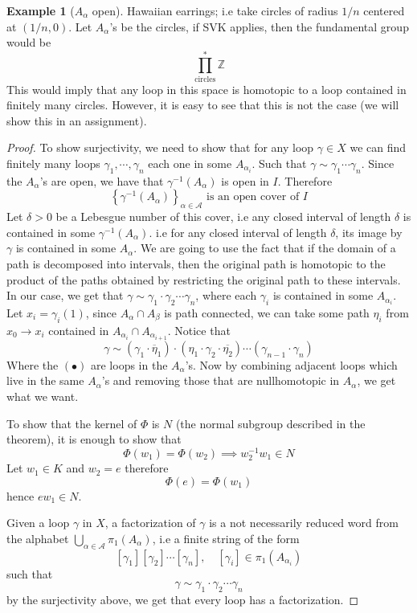 \documentclass[11pt,a4paper]{article}
\theoremstyle{definition}
\newtheorem{example}[definition]{Example}
\theoremstyle{plain}
\theoremstyle{remark}
\newcommand{\Z}{\mathbb{Z}}
\renewcommand{\set}[1]{\left\{ #1 \right\}}
\newcommand{\1}{\mathbbm{1}}
\begin{document}
\begin{example}[$A_\alpha$ open]
    Hawaiian earrings; i.e take circles of radius $1/n$ centered at $(1/n,0)$. Let $A_\alpha$'s be the circles, if SVK applies, then 
    the fundamental group would be 
    $$\prod_{\text{circles}}^* \Z$$
    This would imply that any loop in this space is homotopic to a loop contained in finitely many circles. However, it is easy to see 
    that this is not the case (we will show this in an assignment).
\end{example}

\begin{proof}
    To show surjectivity, we need to show that for any loop $\gamma \in X$ we can find finitely many loops $\gamma_1, \cdots, \gamma_n$ each one in some $A_{\alpha_i}$. Such that 
    $\gamma \sim \gamma_1 \cdots \gamma_n$. Since the $A_\alpha$'s are open, we have that 
    $\gamma^{-1} (A_\alpha)$ is open in $I$. Therefore 
    $$\set{\gamma^{-1} (A_\alpha)}_{\alpha \in \mathcal{A}} \text{ is an open cover of $I$}$$
    Let $\delta > 0$ be a Lebesgue number of this cover, i.e any closed interval of length $\delta$ is contained in some $\gamma^{-1} (A_\alpha)$. 
    i.e for any closed interval of length $\delta$, its image by $\gamma$ is contained in some $A_\alpha$. We are going to use the fact that if the domain 
    of a path is decomposed into intervals, then the original path is homotopic to the product of the paths obtained by restricting the original path to these intervals.
    In our case, we get that $\gamma \sim \gamma_1 \cdot \gamma_2 \cdots \gamma_n$, where each $\gamma_i$ is contained in some $A_{\alpha_i}$. Let $x_i = \gamma_i(1)$, 
    since $A_\alpha \cap A_\beta$ is path connected, we can take some path $\eta_i$ from $x_0 \to x_i$ contained in $A_{\alpha_i} \cap A_{\alpha_{i+1}}$. 
    Notice that 
    $$\gamma \sim (\gamma_1 \cdot \overline{\eta}_1) \cdot (\eta_1 \cdot \gamma_2 \cdot \overline{\eta_2}) \cdots (\gamma_{n-1} \cdot \gamma_n)$$
    Where the $(\bullet)$ are loops in the $A_\alpha$'s. Now by combining adjacent loops which live in the same $A_\alpha$'s and removing those that are nullhomotopic 
    in $A_\alpha$, we get what we want. 
    
    To show that the kernel of $\Phi$ is $N$ (the normal subgroup described in the theorem), it is enough to show that 
    $$\Phi (w_1) = \Phi(w_2) \implies w_2^{-1} w_1 \in N$$
    Let $w_1 \in K$ and $w_2 = e$ therefore 
    $$\Phi(e) = \Phi (w_1)$$
    hence $e w_1 \in N$. 

    Given a loop $\gamma$ in $X$, a factorization of $\gamma$ is a not necessarily reduced word from the alphabet $\bigcup_{\alpha \in \mathcal{A}} \pi_1(A_\alpha)$, i.e a finite string 
    of the form 
    $$[\gamma_1] [\gamma_2] \cdots [\gamma_n], \quad [\gamma_i] \in \pi_1(A_{\alpha_i})$$ 
    such that 
    $$\gamma \sim \gamma_1 \cdot \gamma_2 \cdots \gamma_n$$
    by the surjectivity above, we get that every loop has a factorization. 


\end{proof}
\end{document}
